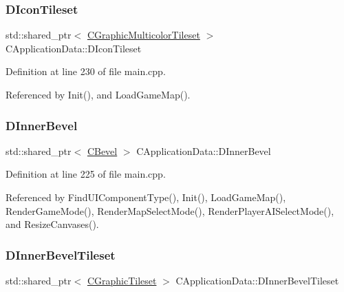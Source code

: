 \subsubsection{\texorpdfstring{D\+Icon\+Tileset}{DIconTileset}}
{\footnotesize\ttfamily std\+::shared\+\_\+ptr$<$ \hyperlink{classCGraphicMulticolorTileset}{C\+Graphic\+Multicolor\+Tileset} $>$ C\+Application\+Data\+::\+D\+Icon\+Tileset\hspace{0.3cm}{\ttfamily [protected]}}



Definition at line 230 of file main.\+cpp.



Referenced by Init(), and Load\+Game\+Map().

\hypertarget{classCApplicationData_a29a687c44dceb9e87a56d96612d59ab5}{}\label{classCApplicationData_a29a687c44dceb9e87a56d96612d59ab5} 
\subsubsection{\texorpdfstring{D\+Inner\+Bevel}{DInnerBevel}}
{\footnotesize\ttfamily std\+::shared\+\_\+ptr$<$ \hyperlink{classCBevel}{C\+Bevel} $>$ C\+Application\+Data\+::\+D\+Inner\+Bevel\hspace{0.3cm}{\ttfamily [protected]}}



Definition at line 225 of file main.\+cpp.



Referenced by Find\+U\+I\+Component\+Type(), Init(), Load\+Game\+Map(), Render\+Game\+Mode(), Render\+Map\+Select\+Mode(), Render\+Player\+A\+I\+Select\+Mode(), and Resize\+Canvases().

\hypertarget{classCApplicationData_ae62d58d93397422437d8f50acfca23e6}{}\label{classCApplicationData_ae62d58d93397422437d8f50acfca23e6} 
\subsubsection{\texorpdfstring{D\+Inner\+Bevel\+Tileset}{DInnerBevelTileset}}
{\footnotesize\ttfamily std\+::shared\+\_\+ptr$<$ \hyperlink{classCGraphicTileset}{C\+Graphic\+Tileset} $>$ C\+Application\+Data\+::\+D\+Inner\+Bevel\+Tileset\hspace{0.3cm}{\ttfamily [protected]}}



